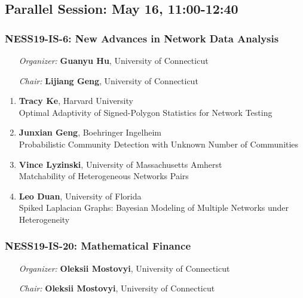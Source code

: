 
\subsection*{Parallel Session: May 16, 11:00-12:40}

\subsubsection*{NESS19-IS-6: New Advances in Network Data Analysis}

\begin{enumerate}[align=left]
\item [\emph{Organizer:}] \textbf{Guanyu Hu}, University of Connecticut
\item [\emph{Chair:}] \textbf{Lijiang Geng},  University of Connecticut
\end{enumerate}

\begin{enumerate}
\item \textbf{Tracy Ke}, Harvard University \\
Optimal Adaptivity of Signed-Polygon Statistics for Network Testing
\item \textbf{Junxian Geng}, Boehringer Ingelheim \\
Probabilistic Community Detection with Unknown Number of Communities
\item \textbf{Vince Lyzinski}, University of Massachusetts Amherst \\
Matchability of Heterogeneous Networks Pairs
\item \textbf{Leo Duan}, University of Florida \\
Spiked Laplacian Graphs: Bayesian Modeling of Multiple Networks under Heterogeneity
\end{enumerate}

\subsubsection*{NESS19-IS-20: Mathematical Finance}

\begin{enumerate}[align=left]
\item [\emph{Organizer:}] \textbf{Oleksii Mostovyi}, University of Connecticut
\item [\emph{Chair:}] \textbf{Oleksii Mostovyi}, University of Connecticut
\end{enumerate}

